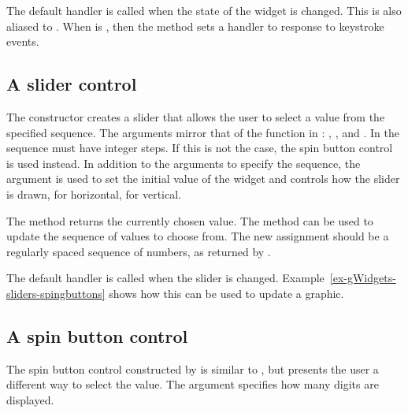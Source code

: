 The default handler is called when the state of the widget is
changed. This is also aliased to
. When  is
, then the  method
sets a handler to response to keystroke events.



\subsection{A slider control}
\label{sec:gWidgets-slider-control}

The  constructor creates a slider that allows the
user to select a value from the specified sequence.  The arguments
mirror that of the  function in \R:
, , and
.  In  the sequence must have
integer steps. If this is not the case, the spin button control is
used instead. In addition to the arguments to specify the sequence,
the argument  is used to set the initial
value of the widget and  controls how
the slider is drawn,  for horizontal,  for
vertical.

The  method returns the currently chosen
value. The \method{[\ASSIGN}{gslider} method can be used to update the
sequence of values to choose from. The new assignment should be a
regularly spaced sequence of numbers, as returned by .

The default handler is called when the slider is changed. Example~\ref{ex-gWidgets-sliders-spingbuttons}
shows how this can be used to update a graphic.


\subsection{A spin button control}
\label{sec:gWidgets-spin-button-control}

The spin button control constructed by  is
similar to  , but presents the user a different
way to select the value. The argument 
specifies how many digits are displayed. 

